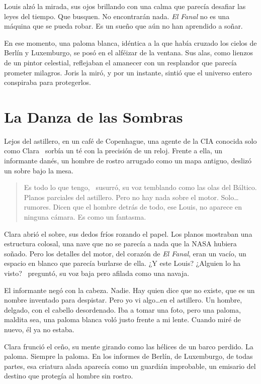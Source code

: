 Louis alzó la mirada, sus ojos brillando con una calma que parecía desafiar las leyes del tiempo. \glqq Que busquen. No encontrarán nada. \emph{El Fanal} no es una máquina que se pueda robar. Es un sueño que aún no han aprendido a soñar.\grqq

En ese momento, una paloma blanca, idéntica a la que había cruzado los cielos de Berlín y Luxemburgo, se posó en el alféizar de la ventana. Sus alas, como lienzos de un pintor celestial, reflejaban el amanecer con un resplandor que parecía prometer milagros. Joris la miró, y por un instante, sintió que el universo entero conspiraba para protegerlos.

\section{La Danza de las Sombras}

Lejos del astillero, en un café de Copenhague, una agente de la CIA conocida solo como \glqq Clara\grqq~ sorbía un té con la precisión de un reloj. Frente a ella, un informante danés, un hombre de rostro arrugado como un mapa antiguo, deslizó un sobre bajo la mesa.

\begin{quote}
\calligra
\glqq Es todo lo que tengo,\grqq~ susurró, su voz temblando como las olas del Báltico. \glqq Planos parciales del astillero. Pero no hay nada sobre el motor. Solo\ldots rumores. Dicen que el hombre detrás de todo, ese Louis, no aparece en ninguna cámara. Es como un fantasma.\grqq
\end{quote}

Clara abrió el sobre, sus dedos fríos rozando el papel. Los planos mostraban una estructura colosal, una nave que no se parecía a nada que la NASA hubiera soñado. Pero los detalles del motor, del corazón de \emph{El Fanal}, eran un vacío, un espacio en blanco que parecía burlarse de ella. \glqq ¿Y este Louis? ¿Alguien lo ha visto?\grqq~ preguntó, su voz baja pero afilada como una navaja.

El informante negó con la cabeza. \glqq Nadie. Hay quien dice que no existe, que es un nombre inventado para despistar. Pero yo vi algo\ldots en el astillero. Un hombre, delgado, con el cabello desordenado. Iba a tomar una foto, pero una paloma, maldita sea, una paloma blanca voló justo frente a mi lente. Cuando miré de nuevo, él ya no estaba.\grqq

Clara frunció el ceño, su mente girando como las hélices de un barco perdido. La paloma. Siempre la paloma. En los informes de Berlín, de Luxemburgo, de todas partes, esa criatura alada aparecía como un guardián improbable, un emisario del destino que protegía al hombre sin rostro.


